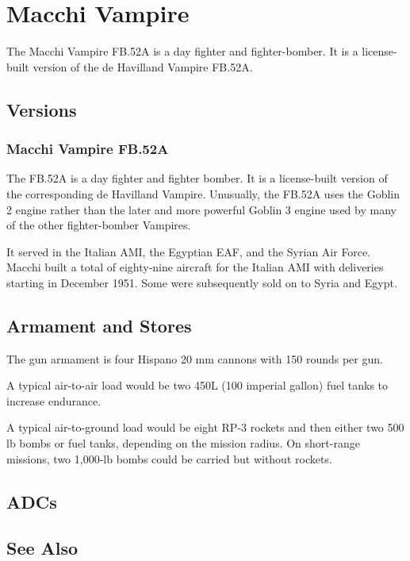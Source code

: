 \section{Macchi Vampire}

The Macchi Vampire FB.52A is a day fighter and fighter-bomber. It is a license-built version of the de Havilland Vampire FB.52A. 

\subsection{Versions}

\subsubsection{Macchi Vampire FB.52A}

The FB.52A is a day fighter and fighter bomber. It is a license-built version of the corresponding de Havilland Vampire. Unusually, the FB.52A uses the Goblin 2 engine rather than the later and more powerful Goblin 3 engine used by many of the other fighter-bomber Vampires. 

It served in the Italian AMI, the Egyptian EAF, and the Syrian Air Force. Macchi built a total of eighty-nine aircraft for the Italian AMI with deliveries starting in December 1951. Some were subsequently sold on to Syria and Egypt.

\subsection{Armament and Stores}

The gun armament is four Hispano 20 mm cannons with 150 rounds per gun. 

A typical air-to-air load would be two 450L (100 imperial gallon) fuel tanks to increase endurance. 

A typical air-to-ground load would be eight RP-3 rockets and then either two 500 lb bombs or fuel tanks, depending on the mission radius. On short-range missions, two 1,000-lb bombs could be carried but without rockets.

\subsection{ADCs}

\begin{adclist}
\end{adclist}

\subsection{See Also}

\begin{typelist}
\end{typelist}